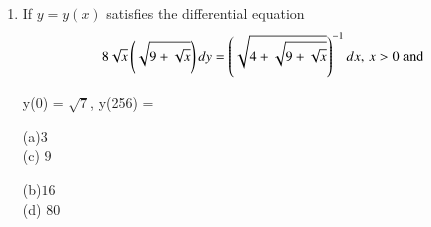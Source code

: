 \documentclass[journal,12pt,twocolumn]{IEEEtran}
\theoremstyle{remark}
\begin{document}
\begin{enumerate}
\begin{multicols}{2}
(a) $\frac{\pi}{3} - \frac{\sqrt{3}}{2}$  \\ (c) $\frac{\pi}{3} - \frac{\sqrt{3}}{4}$ 
\columnbreak

(b) $\frac{\pi}{6} - \frac{\sqrt{3}}{4}$   \\(d) $\frac{\pi}{6} - \frac{\sqrt{3}}{2}$
\end{multicols}

\item If $y = y(x)$ satisfies the differential equation
\[
8\sqrt{x} \left(\sqrt{9+\sqrt{x}}\right) dy = \left(\sqrt{4+\sqrt{9+\sqrt{x}}}\right)^{-1} dx, \, x>0 \text{ and}
\]

y(0) = $\sqrt{7}$,  y(256) = 

\begin{multicols}{2}
(a)$3$  \\ (c) $9$
\columnbreak

(b)$16$   \\(d) $80$
\end{multicols}
\end{enumerate}
\end{document}
